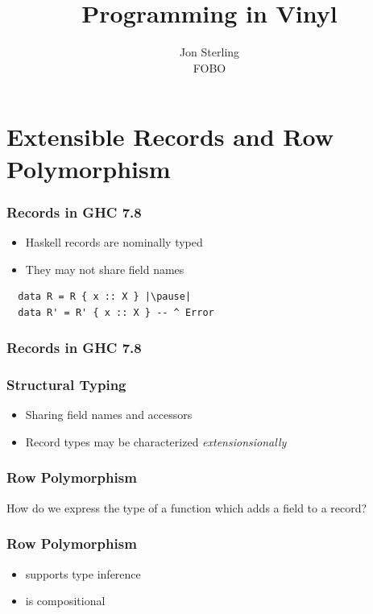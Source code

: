 \documentclass[12pt]{beamer}
\title{Programming in Vinyl}
\author{Jon Sterling\\
    FOBO
}
\begin{document}
\begin{frame}
\titlepage
\end{frame}

\section{Extensible Records and Row Polymorphism}

\begin{frame}[fragile]
  \frametitle{Records in GHC 7.8}\pause
  \begin{itemize}
    \item Haskell records are nominally typed\pause
    \item They may not share field names
  \end{itemize}
  \pause
  \begin{lstlisting}
  data R = R { x :: X } |\pause|
  data R' = R' { x :: X } -- ^ Error
  \end{lstlisting}
\end{frame}

\begin{frame}
  \frametitle{Records in GHC 7.8}
\end{frame}

\begin{frame}
  \frametitle{Structural Typing}\pause
  \begin{itemize}
    \item Sharing field names and accessors\pause
    \item Record types may be characterized \emph{extensionsionally}
  \end{itemize}
\end{frame}

\begin{frame}
  \frametitle{Row Polymorphism}\pause
  How do we express the type of a function which adds a field to a record?\pause
\end{frame}

\begin{frame}
  \frametitle{Row Polymorphism}\pause
  \begin{itemize}
    \item supports type inference\pause
    \item is compositional\pause
  \end{itemize}
\end{frame}
\end{document}
